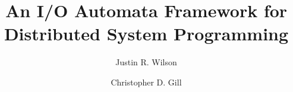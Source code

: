 \documentclass[letterpaper]{article}
\begin{document}
\title{An I/O Automata Framework for Distributed System Programming}
\author{Justin R. Wilson \and Christopher D. Gill}
\date{}

\maketitle
















\end{document}
